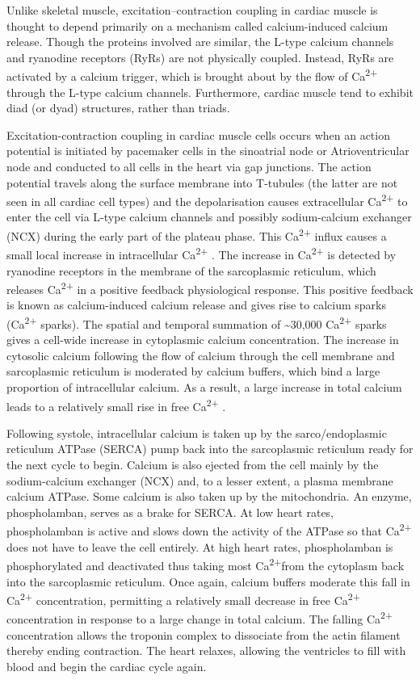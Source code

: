Unlike skeletal muscle, excitation--contraction coupling in cardiac muscle is thought to depend primarily on a mechanism called calcium-induced calcium release. Though the proteins involved are similar, the L-type calcium channels and ryanodine receptors (RyRs) are not physically coupled. Instead, RyRs are activated by a calcium trigger, which is brought about by the flow of Ca\textsuperscript{2+} through the L-type calcium channels. Furthermore, cardiac muscle tend to exhibit diad (or dyad) structures, rather than triads.

Excitation-contraction coupling in cardiac muscle cells occurs when an action potential is initiated by pacemaker cells in the sinoatrial node or Atrioventricular node and conducted to all cells in the heart via gap junctions. The action potential travels along the surface membrane into T-tubules (the latter are not seen in all cardiac cell types) and the depolarisation causes extracellular Ca\textsuperscript{2+} to enter the cell via L-type calcium channels and possibly sodium-calcium exchanger (NCX) during the early part of the plateau phase. This Ca\textsuperscript{2+} influx causes a small local increase in intracellular Ca\textsuperscript{2+} . The increase in Ca\textsuperscript{2+} is detected by ryanodine receptors in the membrane of the sarcoplasmic reticulum, which releases Ca\textsuperscript{2+} in a positive feedback physiological response. This positive feedback is known as calcium-induced calcium release and gives rise to calcium sparks (Ca\textsuperscript{2+} sparks). The spatial and temporal summation of \textasciitilde30,000 Ca\textsuperscript{2+} sparks gives a cell-wide increase in cytoplasmic calcium concentration. The increase in cytosolic calcium following the flow of calcium through the cell membrane and sarcoplasmic reticulum is moderated by calcium buffers, which bind a large proportion of intracellular calcium. As a result, a large increase in total calcium leads to a relatively small rise in free Ca\textsuperscript{2+} .

Following systole, intracellular calcium is taken up by the sarco/endoplasmic reticulum ATPase (SERCA) pump back into the sarcoplasmic reticulum ready for the next cycle to begin. Calcium is also ejected from the cell mainly by the sodium-calcium exchanger (NCX) and, to a lesser extent, a plasma membrane calcium ATPase. Some calcium is also taken up by the mitochondria. An enzyme, phospholamban, serves as a brake for SERCA. At low heart rates, phospholamban is active and slows down the activity of the ATPase so that Ca\textsuperscript{2+} does not have to leave the cell entirely. At high heart rates, phospholamban is phosphorylated and deactivated thus taking most Ca\textsuperscript{2+}from the cytoplasm back into the sarcoplasmic reticulum. Once again, calcium buffers moderate this fall in Ca\textsuperscript{2+} concentration, permitting a relatively small decrease in free Ca\textsuperscript{2+} concentration in response to a large change in total calcium. The falling Ca\textsuperscript{2+} concentration allows the troponin complex to dissociate from the actin filament thereby ending contraction. The heart relaxes, allowing the ventricles to fill with blood and begin the cardiac cycle again.

